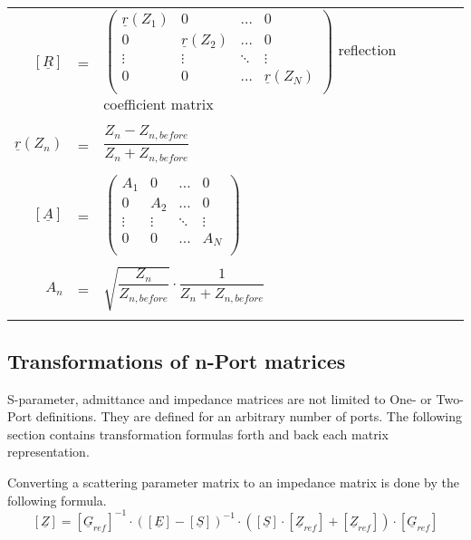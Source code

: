 \begin{tabular}{rll}
$\left[\underline{R}\right]$ & = &
$\begin{pmatrix}
\underline{r}\left(Z_{1}\right) & 0 & \ldots & 0\\
0 & \underline{r}\left(Z_{2}\right) & \ldots & 0\\
\vdots & \vdots & \ddots & \vdots\\
0 & 0 & \ldots & \underline{r}\left(Z_{N}\right)\\
\end{pmatrix}$
reflection coefficient matrix\\& &\\
$\underline{r}\left(Z_{n}\right)$ & = &
$\dfrac{Z_{n} - Z_{n,before}}{Z_{n} + Z_{n,before}}$\\& &\\
$\left[\underline{A}\right]$ & = &
$\begin{pmatrix}
A_1 & 0 & \ldots & 0\\
0 & A_2 & \ldots & 0\\
\vdots & \vdots & \ddots & \vdots\\
0 & 0 & \ldots & A_N\\
\end{pmatrix}$\\& &\\
$A_n$ & = &
$\sqrt{\dfrac{Z_n}{Z_{n,before}}}\cdot\dfrac{1}{Z_{n} + Z_{n,before}}$\\& &\\
\end{tabular}

\subsection{Transformations of n-Port matrices}

S-parameter, admittance and impedance matrices are not limited to One-
or Two-Port definitions.  They are defined for an arbitrary number of
ports.  The following section contains transformation formulas forth
and back each matrix representation.

\addvspace{12pt}

Converting a scattering parameter matrix to an impedance matrix is
done by the following formula.
\begin{equation}
\left[
\underline{Z}
\right]
=
\left[
\underline{G}_{ref}
\right]^{-1}
\cdot
\left(
\left[\underline{E}\right] - \left[\underline{S}\right]
\right)^{-1}
\cdot
\left(
\left[\underline{S}\right] \cdot \left[\underline{Z}_{ref}\right] + \left[\underline{Z}_{ref}\right]
\right)
\cdot
\left[\underline{G}_{ref}\right]
\end{equation}


